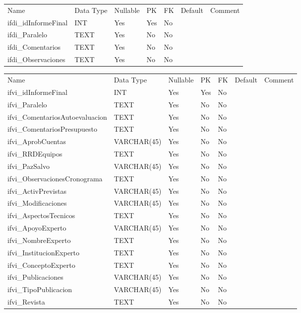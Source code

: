 			\begin{center}
				\begin{tabular}{ |l|l|l|l|l|l|l| }
					\hline
					Name & Data Type & Nullable & PK & FK & Default & Comment \\
					ifdi_idInformeFinal & INT & Yes & Yes & No &  & \\ \hline 
ifdi_Paralelo & TEXT & Yes & No & No &  & \\ \hline 
ifdi_Comentarios & TEXT & Yes & No & No &  & \\ \hline 
ifdi_Observaciones & TEXT & Yes & No & No &  & \\ \hline 

				\end{tabular}
			\end{center}
		

			\begin{center}
				\begin{tabular}{ |l|l|l|l|l|l|l| }
					\hline
					Name & Data Type & Nullable & PK & FK & Default & Comment \\
					ifvi_idInformeFinal & INT & Yes & Yes & No &  & \\ \hline 
ifvi_Paralelo & TEXT & Yes & No & No &  & \\ \hline 
ifvi_ComentariosAutoevaluacion & TEXT & Yes & No & No &  & \\ \hline 
ifvi_ComentariosPresupuesto & TEXT & Yes & No & No &  & \\ \hline 
ifvi_AprobCuentas & VARCHAR(45) & Yes & No & No &  & \\ \hline 
ifvi_RRDEquipos & TEXT & Yes & No & No &  & \\ \hline 
ifvi_PazSalvo & VARCHAR(45) & Yes & No & No &  & \\ \hline 
ifvi_ObservacionesCronograma & TEXT & Yes & No & No &  & \\ \hline 
ifvi_ActivPrevistas & VARCHAR(45) & Yes & No & No &  & \\ \hline 
ifvi_Modificaciones & VARCHAR(45) & Yes & No & No &  & \\ \hline 
ifvi_AspectosTecnicos & TEXT & Yes & No & No &  & \\ \hline 
ifvi_ApoyoExperto & VARCHAR(45) & Yes & No & No &  & \\ \hline 
ifvi_NombreExperto & TEXT & Yes & No & No &  & \\ \hline 
ifvi_InstitucionExperto & TEXT & Yes & No & No &  & \\ \hline 
ifvi_ConceptoExperto & TEXT & Yes & No & No &  & \\ \hline 
ifvi_Publicaciones & VARCHAR(45) & Yes & No & No &  & \\ \hline 
ifvi_TipoPublicacion & VARCHAR(45) & Yes & No & No &  & \\ \hline 
ifvi_Revista & TEXT & Yes & No & No &  & \\ \hline 

				\end{tabular}
			\end{center}
		

